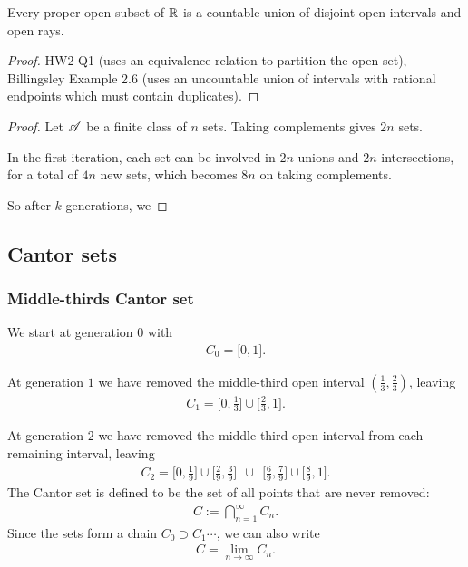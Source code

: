 \begin{theorem}
  Every proper open subset of $\mathbb{R}$ is a countable union of disjoint open intervals and open rays.
\end{theorem}
\begin{proof}
  HW2 Q1 (uses an equivalence relation to partition the open set), Billingsley Example 2.6 (uses an
  uncountable union of intervals with rational endpoints which must contain duplicates).
\end{proof}


\begin{proof}
  Let $\mathscr A$ be a finite class of $n$ sets. Taking complements gives $2n$ sets.

  In the first iteration, each set can be involved in $2n$ unions and $2n$ intersections, for a total of $4n$
  new sets, which becomes $8n$ on taking complements.

  So after $k$ generations, we


\end{proof}
\subsection{Cantor sets}

\subsubsection{Middle-thirds Cantor set}

\begin{definition*}
We start at generation $0$ with
\begin{align*}
  C_0 = \Big[0, 1\Big].
\end{align*}

At generation $1$ we have removed the middle-third open interval $(\frac{1}{3}, \frac{2}{3})$,
leaving
\begin{align*}
  C_1 = \Big[0, \frac{1}{3}\Big] \cup \Big[\frac{2}{3}, 1\Big].
\end{align*}

At generation $2$ we have removed the middle-third open interval from each remaining interval, leaving
\begin{align*}
  C_2 = \Big[0, \frac{1}{9}\Big] \cup \Big[\frac{2}{9}, \frac{3}{9}\Big] ~~\cup~~ \Big[\frac{6}{9}, \frac{7}{9}\Big] \cup \Big[\frac{8}{9}, 1\Big].
\end{align*}
The Cantor set is defined to be the set of all points that are never removed:
\begin{align*}
  C := \bigcap_{n=1}^\infty C_n.
\end{align*}
Since the sets form a chain $C_0 \supset C_1 \cdots$, we can also write
\begin{align*}
  C = \lim_{n\to\infty} C_n.
\end{align*}
\end{definition*}

